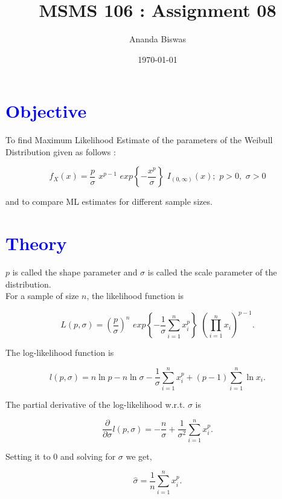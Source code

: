 \documentclass[11pt, a4paper]{article}\usepackage[]{graphicx}\usepackage[]{xcolor}
\title{MSMS 106 : Assignment 08}
\author{Ananda Biswas}
\date{\today}
\begin{document}
\maketitle


\section*{\faArrowAltCircleRight[regular] \textcolor{blue}{Objective}}

\hspace{1cm} To find Maximum Likelihood Estimate of the parameters of the Weibull Distribution given as follows :

$$f_X (x) = \dfrac{p}{\sigma} \,\, x^{p - 1} \,\, exp\left\{-\dfrac{x^p}{\sigma}\right\} \,\, I_{(0, \infty)}(x); \,\, p > 0, \,\, \sigma > 0 $$

and to compare ML estimates for different sample sizes. 



\section*{\faArrowAltCircleRight[regular] \textcolor{blue}{Theory}}

$p$ is called the shape parameter and $\sigma$ is called the scale parameter of the distribution. \\

For a sample of size $n$, the likelihood function is 

$$L(p, \sigma) = \left( \dfrac{p}{\sigma} \right)^{n} \,\, exp \left\{-\dfrac{1}{\sigma}\sum \limits_{i = 1}^{n} x_i^p \right\} \,\, \left( \prod \limits_{i = 1}^{n} x_i \right)^{p - 1}. $$


The log-likelihood function is 

$$ l(p, \sigma) = n \ln p - n \ln \sigma - \dfrac{1}{\sigma}\sum \limits_{i = 1}^{n} x_i^p + ({p - 1}) \sum \limits_{i = 1}^{n} \ln x_i .$$

The partial derivative of the log-likelihood w.r.t. $\sigma$ is

$$ \dfrac{\partial}{\partial \sigma} l(p, \sigma) = - \dfrac{n}{\sigma} + \dfrac{1}{\sigma^2}\sum \limits_{i = 1}^{n} x_i^p . $$

Setting it to $0$ and solving for $\sigma$ we get,

\begin{equation}
\hat{\sigma} =  \dfrac{1}{n}\sum \limits_{i = 1}^{n} x_i^p.
\end{equation}
\end{document}
